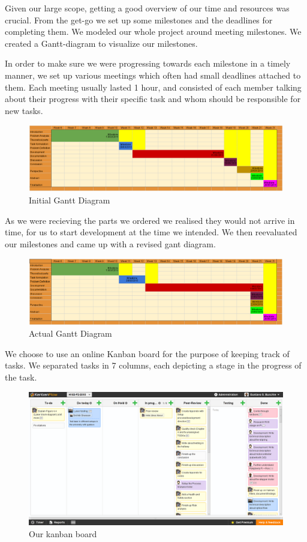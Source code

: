 Given our large scope, getting a good overview of our time and resources was crucial. From the get-go we set up some milestones and the deadlines for completing them. We modeled our whole project around meeting milestones. We created a Gantt-diagram to visualize our milestones.

In order to make sure we were progressing towards each milestone in a timely manner, we set up various meetings which often had small deadlines attached to them. Each meeting usually lasted 1 hour, and consisted of each member talking about their progress with their specific task and whom should be responsible for new tasks.

\begin{figure}[H]
	\centering
	\includegraphics[scale=.35]{images/gantt1.png}
	\caption{Initial Gantt Diagram}
\end{figure}

As we were recieving the parts we ordered we realised they would not arrive in time, for us to start development at the time we intended. We then reevaluated our milestones and came up with a revised gant diagram.

\begin{figure}[H]
	\centering
	\includegraphics[scale=.35]{images/gantt2.png}
	\caption{Actual Gantt Diagram}
\end{figure}

We choose to use an online Kanban board for the purpose of keeping track of tasks. We separated tasks in 7 columns, each depicting a stage in the progress of the task.

\begin{figure}[H]
	\centering
	\includegraphics[scale=.35]{images/kanban.png}
	\caption{Our kanban board}
\end{figure}


